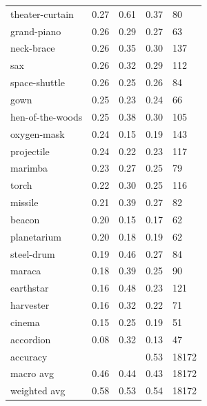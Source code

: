 \begin{center}
\begin{longtable}{lllll}
theater-curtain & 0.27 & 0.61 & 0.37 & 80 \\
grand-piano & 0.26 & 0.29 & 0.27 & 63 \\
neck-brace & 0.26 & 0.35 & 0.30 & 137 \\
sax & 0.26 & 0.32 & 0.29 & 112 \\
space-shuttle & 0.26 & 0.25 & 0.26 & 84 \\
gown & 0.25 & 0.23 & 0.24 & 66 \\
hen-of-the-woods & 0.25 & 0.38 & 0.30 & 105 \\
oxygen-mask & 0.24 & 0.15 & 0.19 & 143 \\
projectile & 0.24 & 0.22 & 0.23 & 117 \\
marimba & 0.23 & 0.27 & 0.25 & 79 \\
torch & 0.22 & 0.30 & 0.25 & 116 \\
missile & 0.21 & 0.39 & 0.27 & 82 \\
beacon & 0.20 & 0.15 & 0.17 & 62 \\
planetarium & 0.20 & 0.18 & 0.19 & 62 \\
steel-drum & 0.19 & 0.46 & 0.27 & 84 \\
maraca & 0.18 & 0.39 & 0.25 & 90 \\
earthstar & 0.16 & 0.48 & 0.23 & 121 \\
harvester & 0.16 & 0.32 & 0.22 & 71 \\
cinema & 0.15 & 0.25 & 0.19 & 51 \\
accordion & 0.08 & 0.32 & 0.13 & 47 \\
\midrule
accuracy &  &  & 0.53 & 18172 \\
macro avg & 0.46 & 0.44 & 0.43 & 18172 \\
weighted avg & 0.58 & 0.53 & 0.54 & 18172 \\
\bottomrule
\end{longtable}
\end{center}

